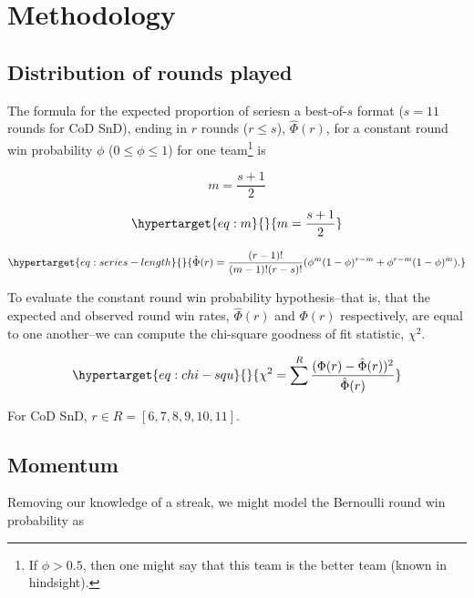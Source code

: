 \documentclass{article}
\begin{document}
\hypertarget{methodology}{%
\section{Methodology}\label{methodology}}

\hypertarget{sec:method-rounds-played}{%
\subsection{Distribution of rounds
played}\label{sec:method-rounds-played}}

The formula for the expected proportion of seriesn a best-of-\(s\)
format (\(s = 11\) rounds for CoD SnD), ending in \(r\) rounds
(\(r \leq s\)), \(\hat{\Phi}(r)\), for a constant round win probability
\(\phi\) (\(0 \leq \phi \leq 1\)) for one team\footnote{If
  \(\phi > 0.5\), then one might say that this team is the better team
  (known in hindsight).} is

\[
m = \frac{s + 1}{2}
\]

\begin{equation}\protect\hypertarget{eq:m}{}{
m = \frac{s + 1}{2}
}\label{eq:m}\end{equation}

\begin{equation}\protect\hypertarget{eq:series-length}{}{
\hat{\Phi}(r) = \frac{(r - 1)!}{(m - 1)!(r - s)!}(\phi^{m}(1 - \phi)^{r - m} + \phi^{r - m}(1 - \phi)^m).
}\label{eq:series-length}\end{equation}

To evaluate the constant round win probability hypothesis--that is, that
the expected and observed round win rates, \(\hat{\Phi}(r)\) and
\(\Phi(r)\) respectively, are equal to one another--we can compute the
chi-square goodness of fit statistic, \(\chi^2\).

\begin{equation}\protect\hypertarget{eq:chi-squ}{}{
\chi^2 = \sum^R \frac{(\Phi(r) - \hat{\Phi}(r))^2}{\hat{\Phi}(r)}
}\label{eq:chi-squ}\end{equation}

For CoD SnD, \(r \in R = [6, 7, 8, 9, 10, 11]\).

\hypertarget{sec:method-momentum}{%
\subsection{Momentum}\label{sec:method-momentum}}

Removing our knowledge of a streak, we might model the Bernoulli round
win probability as
\end{document}
